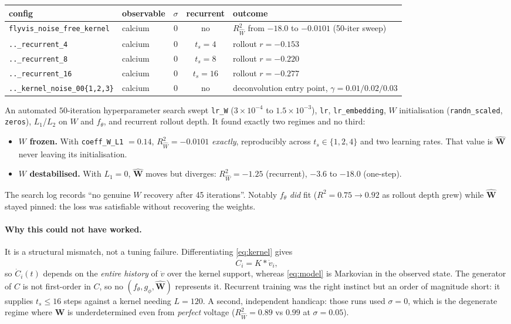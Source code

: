 \documentclass[10pt]{article}
\newcommand{\Rw}{R^2_{\widehat W}}
\newcommand{\Mat}[1]{\mathbf{#1}}
\begin{document}
\begin{center}
{\footnotesize
\begin{tabular}{llccl}
\toprule
config & observable & $\sigma$ & recurrent & outcome \\
\midrule
\texttt{flyvis\_noise\_free\_kernel} & calcium & $0$ & no & $\Rw$ from $-18.0$ to $-0.0101$ (50-iter sweep) \\
\texttt{..\_recurrent\_4}  & calcium & $0$ & $t_s{=}4$  & rollout $r = -0.153$ \\
\texttt{..\_recurrent\_8}  & calcium & $0$ & $t_s{=}8$  & rollout $r = -0.220$ \\
\texttt{..\_recurrent\_16} & calcium & $0$ & $t_s{=}16$ & rollout $r = -0.277$ \\
\texttt{..\_kernel\_noise\_00\{1,2,3\}} & calcium & $0$ & no & deconvolution entry point, $\gamma = 0.01/0.02/0.03$ \\
\bottomrule
\end{tabular}}
\end{center}

An automated $50$-iteration hyperparameter search swept \texttt{lr\_W}
($3\!\times\!10^{-4}$ to $1.5\!\times\!10^{-3}$), \texttt{lr}, \texttt{lr\_embedding},
$W$ initialisation (\texttt{randn\_scaled}, \texttt{zeros}), $L_1$/$L_2$ on $W$ and
$f_\theta$, and recurrent rollout depth. It found exactly two regimes and no third:
\begin{itemize}\itemsep1pt
\item \textbf{$W$ frozen.} With \texttt{coeff\_W\_L1} $=0.14$, $\Rw = -0.0101$
\emph{exactly}, reproducibly across $t_s \in \{1,2,4\}$ and two learning rates.
That value is $\widehat{\Mat{W}}$ never leaving its initialisation.
\item \textbf{$W$ destabilised.} With $L_1 = 0$, $\widehat{\Mat{W}}$ moves but
diverges: $\Rw = -1.25$ (recurrent), $-3.6$ to $-18.0$ (one-step).
\end{itemize}
The search log records ``no genuine $W$ recovery after 45 iterations''. Notably
$f_\theta$ \emph{did} fit ($R^2 = 0.75 \to 0.92$ as rollout depth grew) while
$\widehat{\Mat{W}}$ stayed pinned: the loss was satisfiable without recovering the weights.

\paragraph{Why this could not have worked.} It is a structural mismatch, not a
tuning failure. Differentiating \eqref{eq:kernel} gives
\begin{equation}
\dot C_i = K * \dot v_i ,
\end{equation}
so $\dot C_i(t)$ depends on the \emph{entire history} of $\dot v$ over the
kernel support, whereas \eqref{eq:model} is Markovian in the observed state.
The generator of $C$ is not first-order in $C$, so no $(f_\theta, g_\phi, \widehat{\Mat{W}})$
represents it. Recurrent training was the right instinct but an order of magnitude
short: it supplies $t_s \le 16$ steps against a kernel needing $L = 120$.
A second, independent handicap: those runs used $\sigma = 0$, which is the
degenerate regime where $\Mat{W}$ is underdetermined even from \emph{perfect}
voltage ($\Rw = 0.89$ vs $0.99$ at $\sigma = 0.05$).
\end{document}
